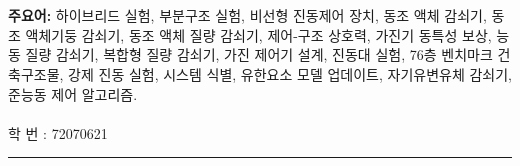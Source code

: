 \\
\\
{\large\textbf{주요어:}}
하이브리드 실험, 부분구조 실험, 비선형 진동제어 장치, 동조 액체 감쇠기, 동조 액체기둥 감쇠기, 동조 액체 질량 감쇠기, 제어-구조 상호력, 가진기 동특성 보상, 능동 질량 감쇠기, 복합형 질량 감쇠기, 가진 제어기 설계, 진동대 실험, 76층 벤치마크 건축구조물, 강제 진동 실험, 시스템 식별, 유한요소 모델 업데이트, 자기유변유체 감쇠기, 준능동 제어 알고리즘.
\\
\\
학 번 : 72070621\\
\noindent\rule[2pt]{\textwidth}{0.5pt}
